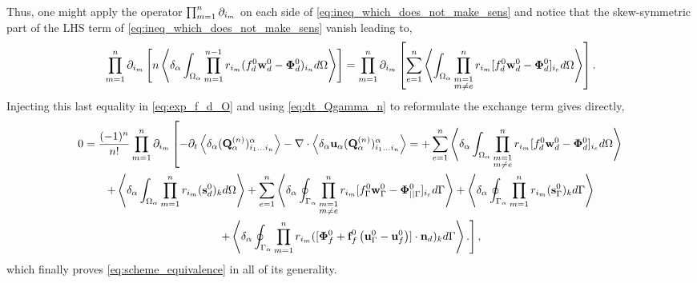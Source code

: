 Thus, one might apply the operator $\prod_{m=1}^{n} \partial_{i_m}$ on each side of \ref{eq:ineq_which_does_not_make_sens} and notice that the skew-symmetric part of the LHS term of \ref{eq:ineq_which_does_not_make_sens} vanish leading to, 
\begin{equation*}
    \partialp{1}{n}\left[
        n\pavg{\int_{\Omega_\alpha} \pri{1}{n-1} ( f_d^0 \textbf{w}_d^0-\bm\Phi_d^0)_{i_n} d\Omega}
        \right]
    =
    \partialp{1}{n}\left[
    \sum_{e=1}^{n} 
    \avg{
        \intO{
        \prod^{n}_{\substack{ m=1 \\m \neq e}} r_{i_m} [f_d^0 \textbf{w}_d^0  - \bm\Phi_d^0]_{i_e}
        }
    }
    \right]. 
    \label{eq:it_make_sens_again}
\end{equation*}
Injecting this last equality in \ref{eq:exp_f_d_O} and using \ref{eq:dt_Qgamma_n} to reformulate the exchange term gives directly, 
\begin{multline}
    0 = \frac{(-1)^n}{n!}
    \prod_{m=1}^{n} \partial_{i_m}
    \left[
        - \partial_t \left<\delta_\alpha (\textbf{Q}_\alpha^{(n)})_{i_1\ldots i_n}^\alpha\right>
        - \mathbf{\nabla}\cdot  \left<\delta_\alpha \textbf{u}_\alpha (\textbf{Q}_\alpha^{(n)})_{i_1\ldots i_n}^\alpha\right>
        =+\sum_{e=1}^{n} 
        \left<\delta_\alpha \int_{\Omega_{\alpha}} 
            \prod^{n}_{\substack{ m=1 \\m \neq e}} r_{i_m} [f_d^0\textbf{w}_d^0  - \bm\Phi_d^0]_{i_e}
         d\Omega\right>\right.\\\left.
        + \left<\delta_\alpha \int_{\Omega_{\alpha}}  \prod_{m=1}^{n} r_{i_m} (\textbf{s}_d^0)_k  d\Omega\right>
        +     
        \sum_{e=1}^{n} 
        \left<\delta_\alpha \oint_{\Gamma_{\alpha}} 
            \prod^{n}_{\substack{ m=1 \\m \neq e}} r_{i_m} [f_\Gamma^0\textbf{w}_\Gamma^0 - \bm\Phi_{||\Gamma}^0]_{i_e}
         d\Gamma\right>
        + \left<\delta_\alpha \oint_{\Gamma_{\alpha}}  \prod_{m=1}^{n} r_{i_m} (\textbf{s}_\Gamma^0)_k  d\Gamma\right> \right.\\\left.
        +\left<\delta_\alpha \oint_{\Gamma_{\alpha}}  \prod_{m=1}^{n} r_{i_m} ([\bm\Phi_f^0 + \textbf{f}_f^0 \left(\textbf{u}_\Gamma^0 - \textbf{u}_f^0\right)]\cdot \textbf{n}_d)_k  d\Gamma\right>. 
    \right],
\end{multline}
which finally proves \ref{eq:scheme_equivalence} in all of its generality.